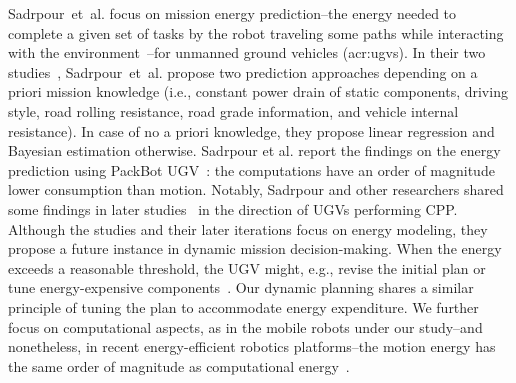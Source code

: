 Sadrpour~et~al. focus on mission energy prediction--the energy needed to complete a given set of tasks by the robot traveling some paths while interacting with the environment~\citep{sadrpour2013mission}--for unmanned ground vehicles (\Gls{acr:ugv}s). In their two studies~\citep{sadrpour2013mission,sadrpour2013experimental}, Sadrpour~et~al. propose two prediction approaches depending on a priori mission knowledge (i.e., constant power drain of static components, driving style, road rolling resistance, road grade information, and vehicle internal resistance). In case of no a priori knowledge, they propose linear regression and Bayesian estimation otherwise. Sadrpour et al. report the findings on the energy prediction using PackBot UGV~\citep{yamaichi2004packbot}: the computations have an order of magnitude lower consumption than motion. Notably, Sadrpour and other researchers shared some findings in later studies~\citep{sadrpour2014real,ersal2014keeping} in the direction of UGVs performing CPP. Although the studies and their later iterations focus on energy modeling, they propose a future instance in dynamic mission decision-making. When the energy exceeds a reasonable threshold, the UGV might, e.g., revise the initial plan or tune energy-expensive components~\citep{sadrpour2013mission}. Our dynamic planning shares a similar principle of tuning the plan to accommodate energy expenditure. We further focus on computational aspects, as in the mobile robots under our study--and nonetheless, in recent energy-efficient robotics platforms--the motion energy has the same order of magnitude as computational energy~\citep{sudhakar2020balancing}.

